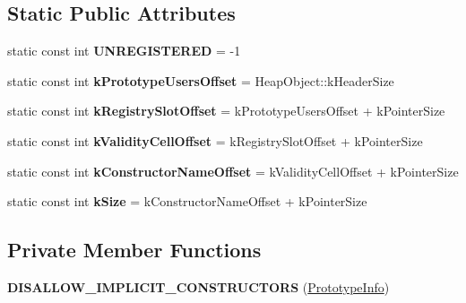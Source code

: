\subsection*{Static Public Attributes}
\begin{DoxyCompactItemize}
\item 
static const int {\bfseries U\+N\+R\+E\+G\+I\+S\+T\+E\+R\+ED} = -\/1\hypertarget{classv8_1_1internal_1_1_prototype_info_a98d62de8e98c5cd39b161902bb947d14}{}\label{classv8_1_1internal_1_1_prototype_info_a98d62de8e98c5cd39b161902bb947d14}

\item 
static const int {\bfseries k\+Prototype\+Users\+Offset} = Heap\+Object\+::k\+Header\+Size\hypertarget{classv8_1_1internal_1_1_prototype_info_a1302870eab35b0cb5109d42b26903526}{}\label{classv8_1_1internal_1_1_prototype_info_a1302870eab35b0cb5109d42b26903526}

\item 
static const int {\bfseries k\+Registry\+Slot\+Offset} = k\+Prototype\+Users\+Offset + k\+Pointer\+Size\hypertarget{classv8_1_1internal_1_1_prototype_info_a3b906319993652cb23451f58a58ddcd1}{}\label{classv8_1_1internal_1_1_prototype_info_a3b906319993652cb23451f58a58ddcd1}

\item 
static const int {\bfseries k\+Validity\+Cell\+Offset} = k\+Registry\+Slot\+Offset + k\+Pointer\+Size\hypertarget{classv8_1_1internal_1_1_prototype_info_acd8f9aeb2ef2c796f0a7898bb44553ea}{}\label{classv8_1_1internal_1_1_prototype_info_acd8f9aeb2ef2c796f0a7898bb44553ea}

\item 
static const int {\bfseries k\+Constructor\+Name\+Offset} = k\+Validity\+Cell\+Offset + k\+Pointer\+Size\hypertarget{classv8_1_1internal_1_1_prototype_info_ab3c4eb9043c0cf109bfda4dd0206ef6c}{}\label{classv8_1_1internal_1_1_prototype_info_ab3c4eb9043c0cf109bfda4dd0206ef6c}

\item 
static const int {\bfseries k\+Size} = k\+Constructor\+Name\+Offset + k\+Pointer\+Size\hypertarget{classv8_1_1internal_1_1_prototype_info_a84ca9d4eaced6fda3553bdfbd0b3f79e}{}\label{classv8_1_1internal_1_1_prototype_info_a84ca9d4eaced6fda3553bdfbd0b3f79e}

\end{DoxyCompactItemize}
\subsection*{Private Member Functions}
\begin{DoxyCompactItemize}
\item 
{\bfseries D\+I\+S\+A\+L\+L\+O\+W\+\_\+\+I\+M\+P\+L\+I\+C\+I\+T\+\_\+\+C\+O\+N\+S\+T\+R\+U\+C\+T\+O\+RS} (\hyperlink{classv8_1_1internal_1_1_prototype_info}{Prototype\+Info})\hypertarget{classv8_1_1internal_1_1_prototype_info_a106d3b381ce4494ce316d53fe30b124f}{}\label{classv8_1_1internal_1_1_prototype_info_a106d3b381ce4494ce316d53fe30b124f}

\end{DoxyCompactItemize}
